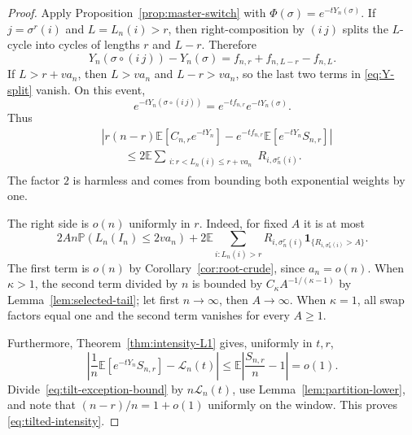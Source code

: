 \documentclass[11pt]{article}
\newcommand{\E}{\mathbb E}
\newcommand{\Pp}{\mathbb P}
\newcommand{\1}{\mathbf 1}
\newcommand{\cL}{\mathcal L}
\theoremstyle{definition}
\theoremstyle{remark}
\begin{document}
\begin{proof}
Apply Proposition~\ref{prop:master-switch} with
$\Phi(\sigma)=e^{-tY_n(\sigma)}$.  If $j=\sigma^r(i)$ and
$L=L_n(i)>r$, then right-composition by $(i\,j)$ splits the $L$-cycle
into cycles of lengths $r$ and $L-r$.  Therefore
\begin{equation}\label{eq:Y-split}
  Y_n(\sigma\circ(i\,j))-Y_n(\sigma)
  =f_{n,r}+f_{n,L-r}-f_{n,L}.
\end{equation}
If $L>r+va_n$, then $L>va_n$ and $L-r>va_n$, so the last two terms in
\eqref{eq:Y-split} vanish.  On this event,
\[
  e^{-tY_n(\sigma\circ(i\,j))}
  =e^{-tf_{n,r}}e^{-tY_n(\sigma)}.
\]
Thus
\begin{align}
 &\left|
 r(n-r)\E[C_{n,r}e^{-tY_n}]
 -e^{-tf_{n,r}}\E[e^{-tY_n}S_{n,r}]
 \right|
 \nonumber\\
 &\qquad\leq
 2\E\sum_{\substack{i:r<L_n(i)\leq r+va_n}}
 R_{i,\sigma_n^r(i)}.
 \label{eq:tilt-exception-bound}
\end{align}
The factor $2$ is harmless and comes from bounding both exponential
weights by one.

The right side is $o(n)$ uniformly in $r$.  Indeed, for fixed $A$ it is
at most
\[
  2A n\Pp(L_n(I_n)\leq2va_n)
  +2\E\sum_{i:L_n(i)>r}
     R_{i,\sigma_n^r(i)}\1_{\{R_{i,\sigma_n^r(i)}>A\}}.
\]
The first term is $o(n)$ by Corollary~\ref{cor:root-crude}, since
$a_n=o(n)$.  When $\kappa>1$, the second term divided by $n$ is bounded
by $C_\kappa A^{-1/(\kappa-1)}$ by
Lemma~\ref{lem:selected-tail}; let first $n\to\infty$, then
$A\to\infty$.  When $\kappa=1$, all swap factors equal one and the
second term vanishes for every $A\geq1$.

Furthermore, Theorem~\ref{thm:intensity-L1} gives, uniformly in $t,r$,
\begin{equation}\label{eq:weighted-S}
 \left|
 \frac1n\E[e^{-tY_n}S_{n,r}]-\cL_n(t)
 \right|
 \leq
 \E\left|\frac{S_{n,r}}n-1\right|=o(1).
\end{equation}
Divide~\eqref{eq:tilt-exception-bound} by
$n\cL_n(t)$, use Lemma~\ref{lem:partition-lower}, and note that
$(n-r)/n=1+o(1)$ uniformly on the window.  This proves
\eqref{eq:tilted-intensity}.
\end{proof}
\end{document}
